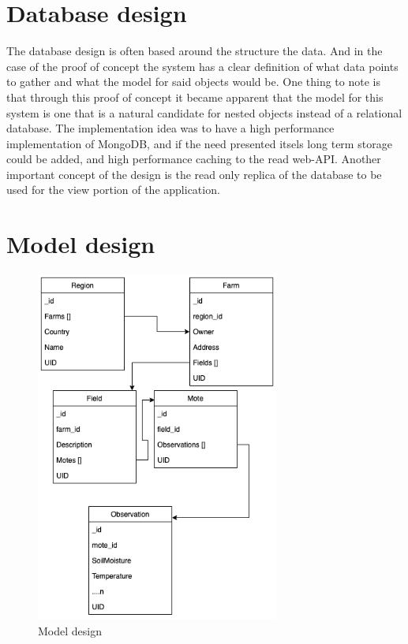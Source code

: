 \documentclass[]{uiophd}
\begin{document}
\section{Database design}
The database design is often based around the structure the data. And in the case of the proof of concept the system has a clear definition of what data points to gather and what the model for said objects would be. One thing to note is that through this proof of concept it became apparent that the model for this system is one that is a natural candidate for nested objects instead of a relational database. The implementation idea was to have a high performance implementation of MongoDB, and if the need presented itsels long term storage could be added, and high performance caching to the read web-API. Another important concept of the design is the read only replica of the database to be used for the view portion of the application.
\section{Model design}
\begin{figure}[h]
\caption{Model design}
\centering
\includegraphics[width=8cm]{model_golden.png}
\end{figure}
\end{document}
